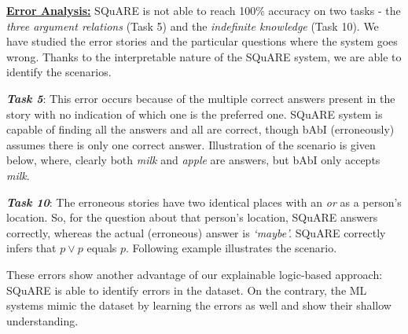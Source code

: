 \documentclass[letterpaper]{article}
\begin{document}
\smallskip 
\noindent\textbf{\underline{Error Analysis:}}
SQuARE is not able to reach 100\% accuracy on two tasks  - the \textit{three argument relations} (Task 5) and the \textit{indefinite knowledge} (Task 10). We have studied the error stories and the particular questions where the system goes wrong. Thanks to the interpretable nature of the SQuARE system, we are able to identify the scenarios. 

\noindent
\textit{\textbf{Task 5}}: This error occurs because of the multiple correct answers present in the story 
with no indication of which one is the preferred one.
SQuARE system is capable of finding all the answers and all are correct, though bAbI (erroneously) assumes there is only one  correct answer. Illustration of the scenario is given below, where, clearly both \textit{milk} and \textit{apple} are answers, but bAbI only accepts \textit{milk}.

\smallskip 
    \noindent
\cprotect {}

\medskip 
\noindent\textit{\textbf{Task 10}}: The erroneous stories have two identical places with an \textit{or} as a person's location. So, for the question about that person's location, SQuARE answers correctly, whereas the actual (erroneous) answer is \textit{`maybe'.} SQuARE correctly infers that $p \vee p$ equals $p$. Following example illustrates the scenario.
    
    \smallskip\noindent
\cprotect {}

\smallskip
\noindent
These errors show another advantage of our  explainable logic-based approach: SQuARE is able to identify errors in the dataset. On the contrary, the ML systems mimic the dataset by learning the errors as well and show their shallow understanding.
\end{document}
